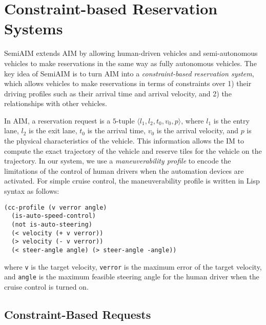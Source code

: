 \section{Constraint-based Reservation Systems}
\label{sec:constraint}

SemiAIM extends AIM by allowing human-driven vehicles and
semi-autonomous vehicles to make reservations in the same way as
fully autonomous vehicles.  The key idea of SemiAIM is to turn AIM into a
\emph{constraint-based reservation system}, which allows vehicles to
make reservations in terms of constraints over 1) their driving
profiles such as their arrival time and arrival velocity, and 2) the
relationships with other vehicles.

In AIM, a reservation request is a $5$-tuple $\langle l_1, l_2, t_0,
v_0, p\rangle$, where $l_1$ is the entry lane, $l_2$ is the exit lane,
$t_0$ is the arrival time, $v_0$ is the arrival velocity, and $p$ is
the physical characteristics of the vehicle.  This information allows
the IM to compute the exact trajectory of the vehicle and reserve
tiles for the vehicle on the trajectory.
In our system, we use a
\emph{maneuverability profile} to encode the limitations of the
control of human drivers when the automation devices are activated.
For simple cruise control, the maneuverability profile is written in
Lisp syntax as follows:
\begin{small}
\begin{verbatim}
(cc-profile (v verror angle)
  (is-auto-speed-control)
  (not is-auto-steering)
  (< velocity (+ v verror))
  (> velocity (- v verror))
  (< steer-angle angle) (> steer-angle -angle))
\end{verbatim}
\end{small}
\noindent
where \texttt{v} is the target velocity, \texttt{verror} is the
maximum error of the target velocity, and \texttt{angle} is the
maximum feasible steering angle for the human driver when the cruise
control is turned on.

\subsection{Constraint-Based Requests}

